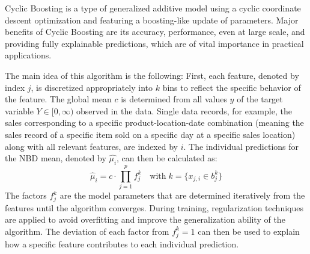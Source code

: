 \documentclass[BCOR=1mm, DIV=calc,10pt,
twoside=true,
twocolumn,
headings=normal]{scrartcl}
\begin{document}
Cyclic Boosting \cite{Wick2019} is a type of generalized additive model using a cyclic coordinate descent optimization and featuring a boosting-like update of parameters. Major benefits of Cyclic Boosting are its accuracy, performance, even at large scale, and providing fully explainable predictions, which are of vital importance in practical applications.

The main idea of this algorithm is the following: First, each feature, denoted by index $j$, is discretized appropriately into $k$ bins to reflect the specific behavior of the feature. The global mean $c$ is determined from all values $y$ of the target variable $Y \in [0,\infty)$ observed in the data. Single data records, for example, the sales corresponding to a specific product-location-date combination (meaning the sales record of a specific item sold on a specific day at a specific sales location) along with all relevant features, are indexed by $i$.
The individual predictions for the NBD mean, denoted by $\hat{\mu_i}$, can then be calculated as:
\begin{equation} \label{eqn:cb}
\hat{\mu}_i = c \cdot \prod \limits_{j=1}^p f^k_j \quad \text{with}\; k=\{ x_{j,i} \in b^k_j\}
\end{equation}
The factors $f^k_j$ are the model parameters that are determined iteratively from the features until the algorithm converges. During training, regularization techniques are applied to avoid overfitting and improve the generalization ability of the algorithm. The deviation of each factor from $f^k_j=1$ can then be used to explain how a specific feature contributes to each individual prediction.
\end{document}
